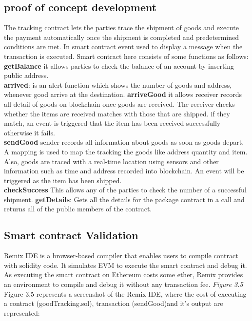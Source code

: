 \subsection{proof of concept development }
The tracking contract lets the parties trace the shipment of goods and execute the payment automatically once the shipment is completed and predetermined conditions are met. In smart contract event used to display a message when the transaction is executed. Smart contract here consists of some functions as follows:\\
\textbf{getBalance} it allows parties to check the balance of an account by inserting public address.\\
\textbf{arrived}: is an alert function which shows the number of goods and address, whenever good arrive at the destination.
\textbf{arriveGood} it allows receiver records all detail of goods on blockchain once goods are received. The receiver checks whether the items are received matches with those that are shipped. if they match, an event is triggered that the item has been received successfully otherwise it fails.\\
\textbf{sendGood} sender records all information about goods as soon as goods depart. A mapping is used to map the tracking the goods like address quantity and item. Also, goods are traced with a real-time location using sensors and other information such as time and address recorded into blockchain. An event will be triggered as the item has been shipped.\\
\textbf{checkSuccess} This allows any of the parties to check the number of a successful shipment.
\textbf{getDetails}: Gets all the details for the package contract in a call and returns all of the public members of the contract. 

\subsection{Smart contract Validation}
Remix IDE is a browser-based compiler that enables users to compile contract with solidity code. It simulates EVM  to execute the smart contract and debug it.  As executing the smart contract on Ethereum costs some
ether, Remix provides an environment to compile and debug it without any transaction fee. \textit{Figure 3.5} Figure 3.5 represents a screenshot of the Remix IDE, where the cost of executing a
contract (goodTracking.sol), transaction (sendGood)and it's output are represented: 


